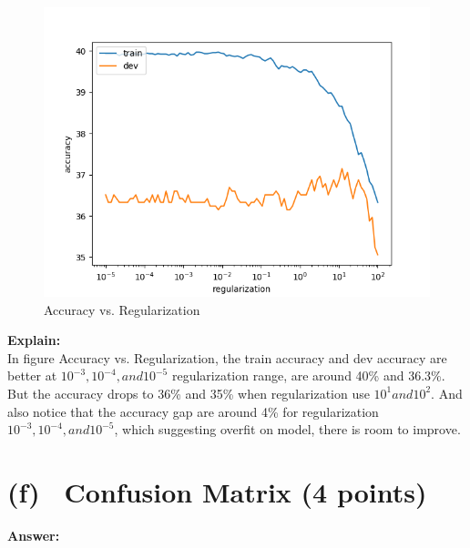 \documentclass[fleqn]{MJD}
\newcommand{\subproblem}[2]{\section{(#1)~ #2}}
\newcommand{\0}{\emptyset}
\begin{document}
\begin{figure}[!htbp]\centering
	\label{figure:acc_vs_reg}
	\caption{Accuracy vs. Regularization}
	\includegraphics[scale=0.7]{q4_reg_v_acc.png}
\end{figure}
\noindent \textbf{Explain:}\\
\noindent In figure Accuracy vs. Regularization, the train accuracy and dev accuracy are better at $10^{-3}, 10^{-4}, and 10^{-5}$ regularization range, are around 40\% and 36.3\%. But the accuracy drops to 36\% and 35\% when regularization use $10^{1} and 10^{2}$. And also notice that the accuracy gap are around 4\% for regularization  $10^{-3}, 10^{-4}, and 10^{-5}$, which suggesting overfit on model, there is room to improve.

\newpage
\subproblem{f}{Confusion Matrix (4 points)}

\textbf{Answer:}\\
\end{document}
